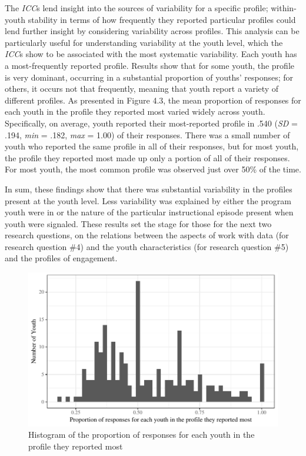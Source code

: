 \documentclass[]{msu-thesis}
\theoremstyle{definition}
\theoremstyle{definition}
\theoremstyle{definition}
\theoremstyle{remark}
\begin{document}
The \emph{ICC}s lend insight into the sources of variability for a
specific profile; within-youth stability in terms of how frequently they
reported particular profiles could lend further insight by considering
variability across profiles. This analysis can be particularly useful
for understanding variability at the youth level, which the \emph{ICC}s
show to be associated with the most systematic variability. Each youth
has a most-frequently reported profile. Results show that for some
youth, the profile is very dominant, occurring in a substantial
proportion of youths' responses; for others, it occurs not that
frequently, meaning that youth report a variety of different profiles.
As presented in Figure 4.3, the mean proportion of responses for each
youth in the profile they reported most varied widely across youth.
Specifically, on average, youth reported their most-reported profile in
.540 (\emph{SD} = .194, \emph{min} = .182, \emph{max} = 1.00) of their
responses. There was a small number of youth who reported the same
profile in all of their responses, but for most youth, the profile they
reported most made up only a portion of all of their responses. For most
youth, the most common profile was observed just over 50\% of the time.

In sum, these findings show that there was substantial variability in
the profiles present at the youth level. Less variability was explained
by either the program youth were in or the nature of the particular
instructional episode present when youth were signaled. These results
set the stage for those for the next two research questions, on the
relations between the aspects of work with data (for research question
\#4) and the youth characteristics (for research question \#5) and the
profiles of engagement.

\begin{figure}

{\centering \includegraphics[width=0.8\linewidth]{rosenberg-dissertation_files/figure-latex/unnamed-chunk-14-1} 

}

\caption{Histogram of the proportion of responses for each youth in the profile they reported most}\label{fig:unnamed-chunk-14}
\end{figure}
\end{document}
